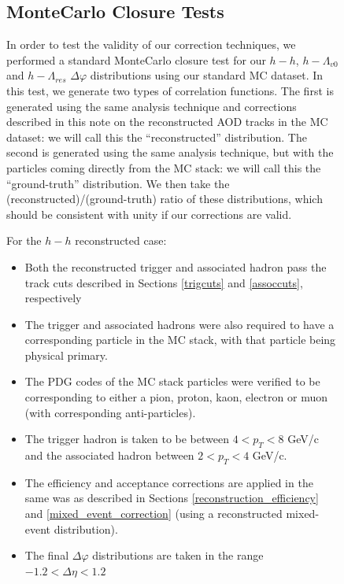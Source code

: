 \documentclass[ALICE,manyauthors]{ALICE_analysis_notes}
\begin{document}
\begin{figure}[ht]
\subsection{MonteCarlo Closure Tests}
\label{mc_closure}
In order to test the validity of our correction techniques, we performed a standard MonteCarlo closure test for our $h-h$, $h-\Lambda_{v0}$ and $h-\Lambda_{res}$ $\Delta\varphi$ distributions using our standard MC dataset. In this test, we generate two types of correlation functions. The first is generated using the same analysis technique and corrections described in this note on the reconstructed AOD tracks in the MC dataset: we will call this the ``reconstructed'' distribution. The second is generated using the same analysis technique, but with the particles coming directly from the MC stack: we will call this the ``ground-truth'' distribution. We then take the (reconstructed)/(ground-truth) ratio of these distributions, which should be consistent with unity if our corrections are valid. 

For the $h-h$ reconstructed case: 
\begin{itemize}
\item Both the reconstructed trigger and associated hadron pass the track cuts described in Sections \ref{trigcuts} and \ref{assoccuts}, respectively 
\item The trigger and associated hadrons were also required to have a corresponding particle in the MC stack, with that particle being physical primary.
\item The PDG codes of the MC stack particles were verified to be corresponding to either a pion, proton, kaon, electron or muon (with corresponding anti-particles).
\item The trigger hadron is taken to be between $4 < p_{T} < 8$ GeV/c and the associated hadron between $2 < p_{T} < 4$ GeV/c. 
\item The efficiency and acceptance corrections are applied in the same was as described in Sections \ref{reconstruction_efficiency} and \ref{mixed_event_correction} (using a reconstructed mixed-event distribution). 
\item The final $\Delta\varphi$ distributions are taken in the range $-1.2 < \Delta\eta < 1.2$
\end{itemize}


\end{figure}
\end{document}
